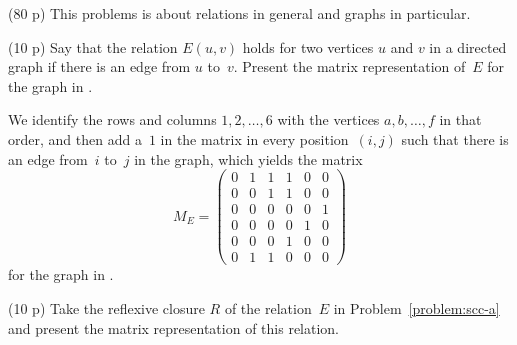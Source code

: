 \documentclass{jn-pset}
\begin{document}
\begin{problem}%
  \label{problem:scc}%
  (80 p)  
  This problems is about relations in general and
  graphs in particular.
%   
%   
%         
%   
  
  \begin{subproblem}
    {(10 p)}
    {\ignorespaces}
  \label{problem:scc-a}%
    Say that the relation $E(u,v)$ holds for two vertices $u$ and $v$
    in a directed graph if there is
    an
    edge from $u$ to~$v$.   
    Present the matrix representation
    of~$E$
    for the graph in
    .
  \end{subproblem}

  {}    
  {}    
  
  \begin{solution}
    We identify the rows and columns
    $1, 2, \ldots, 6$
    with the vertices
    $a, b, \ldots, f$
    in that order,
    and then
    add a~$1$ in the matrix in every position~$(i,j)$
    such that there is an edge from~$i$ to~$j$ in the graph, 
    which yields the matrix
  \begin{equation}
    \label{eq:adjacency-matrix}
    M_E =
    \begin{pmatrix}
       0 & 1 & 1 & 1 & 0 & 0 \\
       0 & 0 & 1 & 1 & 0 & 0 \\
       0 & 0 & 0 & 0 & 0 & 1 \\
       0 & 0 & 0 & 0 & 1 & 0 \\
       0 & 0 & 0 & 1 & 0 & 0 \\
       0 & 1 & 1 & 0 & 0 & 0 
    \end{pmatrix}
  \end{equation}
  for the graph in
  .
\end{solution}

  \begin{subproblem}
    {(10 p)}
    {\ignorespaces}
    \label{problem:scc-b}%
    Take the reflexive closure $R$ of the relation~$E$ in
    Problem~\ref{problem:scc-a}
    and 
    present the matrix representation of this relation.
  \end{subproblem}


\end{problem}
\end{document}
